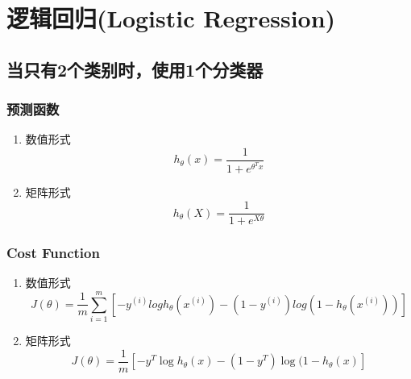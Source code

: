 \section{逻辑回归(Logistic Regression)}
\subsection{当只有2个类别时，使用1个分类器}


\subsubsection{预测函数}
\begin{enumerate}
\item 数值形式
\begin{equation}
	h_\theta(x) = \frac{1}{1 + e^{\theta^T x}}
\end{equation}

\item 矩阵形式
\begin{equation}
	h_\theta(X) = \frac{1}{1 + e^{X \theta}}
\end{equation}
\end{enumerate}


\subsubsection{Cost Function}
\begin{enumerate}
\item 数值形式
\begin{equation}
	J(\theta) = \frac{1}{m}
	    \sum_{i=1}^m \left[ -y^{(i)}log{h_\theta(x^{(i)})} - (1-y^{(i)})log{(1-h_\theta(x^{(i)}))} \right]
\end{equation}

\item 矩阵形式
\begin{equation}
		J(\theta) = \frac{1}{m} \left[-y^T \log{h_\theta(x)} - (1-y^T) \log{(1-h_\theta(x)}\right]
\end{equation}
\end{enumerate}



